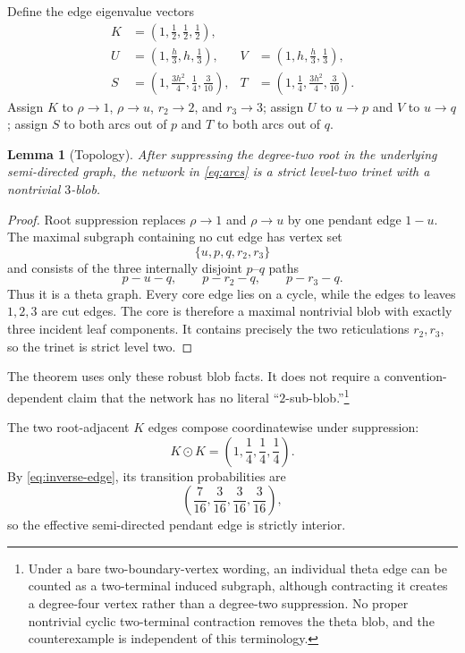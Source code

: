 \documentclass[11pt]{article}
\newtheorem{lemma}[theorem]{Lemma}
\theoremstyle{remark}
\newcommand{\odotv}{\mathbin{\odot}}
\begin{document}
Define the edge eigenvalue vectors
\begin{equation}\label{eq:network-vectors}
\begin{aligned}
 K&=\left(1,\frac12,\frac12,\frac12\right),\\
 U&=\left(1,\frac h3,h,\frac13\right),&
 V&=\left(1,h,\frac h3,\frac13\right),\\
 S&=\left(1,\frac{3h^2}{4},\frac14,\frac3{10}\right),&
 T&=\left(1,\frac14,\frac{3h^2}{4},\frac3{10}\right).
\end{aligned}
\end{equation}
Assign $K$ to $\rho\to1$, $\rho\to u$, $r_2\to2$, and $r_3\to3$; assign $U$ to $u\to p$ and $V$ to $u\to q$; assign $S$ to both arcs out of $p$ and $T$ to both arcs out of $q$.

\begin{lemma}[Topology]\label{lem:topology}
After suppressing the degree-two root in the underlying semi-directed graph, the network in \eqref{eq:arcs} is a strict level-two trinet with a nontrivial $3$-blob.
\end{lemma}

\begin{proof}
Root suppression replaces $\rho\to1$ and $\rho\to u$ by one pendant edge $1-u$.  The maximal subgraph containing no cut edge has vertex set
\[
  \{u,p,q,r_2,r_3\}
\]
and consists of the three internally disjoint $p$--$q$ paths
\[
  p-u-q,
  \qquad p-r_2-q,
  \qquad p-r_3-q.
\]
Thus it is a theta graph.  Every core edge lies on a cycle, while the edges to leaves $1,2,3$ are cut edges.  The core is therefore a maximal nontrivial blob with exactly three incident leaf components.  It contains precisely the two reticulations $r_2,r_3$, so the trinet is strict level two.
\end{proof}

The theorem uses only these robust blob facts.  It does not require a convention-dependent claim that the network has no literal ``$2$-sub-blob.''\footnote{Under a bare two-boundary-vertex wording, an individual theta edge can be counted as a two-terminal induced subgraph, although contracting it creates a degree-four vertex rather than a degree-two suppression.  No proper nontrivial cyclic two-terminal contraction removes the theta blob, and the counterexample is independent of this terminology.}

The two root-adjacent $K$ edges compose coordinatewise under suppression:
\begin{equation}\label{eq:K2}
  K\odotv K=\left(1,\frac14,\frac14,\frac14\right).
\end{equation}
By \eqref{eq:inverse-edge}, its transition probabilities are
\begin{equation}\label{eq:K2-probs}
  \left(\frac7{16},\frac3{16},\frac3{16},\frac3{16}\right),
\end{equation}
so the effective semi-directed pendant edge is strictly interior.
\end{document}

